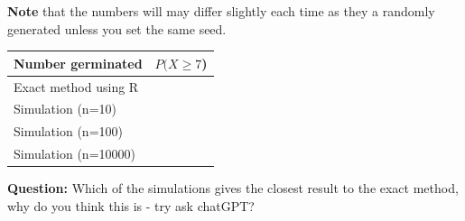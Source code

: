 \documentclass[
  10pt,
  letterpaper,
  DIV=11,
  numbers=noendperiod]{scrartcl}
\begin{document}
\textbf{Note} that the numbers will may differ slightly each time as
they a randomly generated unless you set the same seed.

\begin{longtable}[]{@{}ll@{}}
\toprule\noalign{}
Number germinated & \(P(X\ge{7}\)) \\
\midrule\noalign{}
\endhead
\bottomrule\noalign{}
\endlastfoot
Exact method using R & \\
Simulation (n=10) & \\
Simulation (n=100) & \\
Simulation (n=10000) & \\
\end{longtable}

\textbf{Question:} Which of the simulations gives the closest result to
the exact method, why do you think this is - try ask chatGPT?
\end{document}
